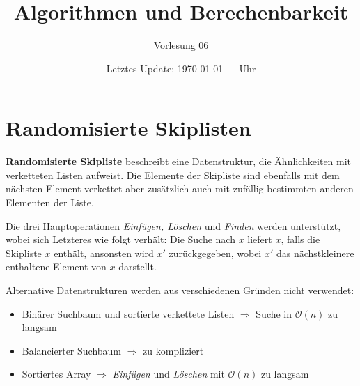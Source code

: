 \documentclass{scrartcl}%
\begin{document}
    \subject{Vorlesungsmitschrieb}
    \title{Algorithmen und Berechenbarkeit}
    \subtitle{Vorlesung 06}
    \date{Letztes Update: \today \ - \currenttime \ Uhr}
    \maketitle

    \section*{Randomisierte Skiplisten}\label{sec:skiplisten}
    \textsf{\textbf{Randomisierte Skipliste}} beschreibt eine Datenstruktur, die Ähnlichkeiten mit verketteten Listen aufweist.
    Die Elemente der Skipliste sind ebenfalls mit dem nächsten Element verkettet aber zusätzlich auch mit zufällig bestimmten anderen Elementen der Liste.

    Die drei Hauptoperationen \textit{Einfügen, Löschen} und \textit{Finden} werden unterstützt, wobei sich Letzteres wie folgt verhält:
    Die Suche nach $x$ liefert $x$, falls die Skipliste $x$ enthält, ansonsten wird $x'$ zurückgegeben, wobei $x'$ das nächstkleinere enthaltene Element von $x$ darstellt.

    Alternative Datenstrukturen werden aus verschiedenen Gründen nicht verwendet:
    \begin{itemize}
        \item Binärer Suchbaum und sortierte verkettete Listen \newline $\Rightarrow$ Suche in $\mathcal{O}(n)$ zu langsam
        \item Balancierter Suchbaum \newline $\Rightarrow$ zu kompliziert
        \item Sortiertes Array \newline $\Rightarrow$ \textit{Einfügen} und \textit{Löschen} mit $\mathcal{O}(n)$ zu langsam
    \end{itemize}
\end{document}

